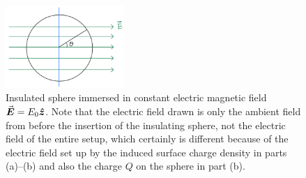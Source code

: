 
\begin{figure}[h!]
   \centering
   \includegraphics[width=0.4\textwidth]{prob3.jpeg}
   \caption{Insulated sphere immersed in constant electric magnetic field $\va*{E} = E_0 \vu*{z}$. Note that the electric field drawn is only the ambient field from before the insertion of the insulating sphere, not the electric field of the entire setup, which certainly is different because of the electric field set up by the induced surface charge density in parts (a)--(b) and also the charge $Q$ on the sphere in part (b).}
   \label{fig:prob3}
\end{figure}

